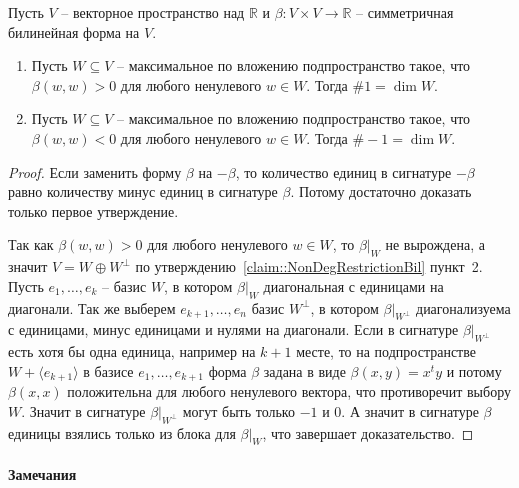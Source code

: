 \begin{claim}
Пусть $V$ -- векторное пространство над $\mathbb R$ и $\beta\colon V\times V\to \mathbb R$ -- симметричная билинейная форма на $V$.
\begin{enumerate}
\item Пусть $W\subseteq V$ -- максимальное по вложению подпространство такое, что $\beta(w, w) > 0$ для любого ненулевого $w\in W$.
Тогда $\#1 = \dim W$.

\item Пусть $W\subseteq V$ -- максимальное по вложению подпространство такое, что $\beta(w, w) < 0$ для любого ненулевого $w\in W$.
Тогда $\#-1 = \dim W$.
\end{enumerate}
\end{claim}
\begin{proof}
Если заменить форму $\beta$ на $-\beta$, то количество единиц в сигнатуре $-\beta$ равно количеству минус единиц в сигнатуре $\beta$.
Потому достаточно доказать только первое утверждение.


Так как $\beta(w, w) > 0$ для любого ненулевого $w\in W$, то $\beta|_W$ не вырождена, а значит $V = W\oplus W^\bot$  по утверждению~\ref{claim::NonDegRestrictionBil} пункт~2.
Пусть $e_1,\ldots,e_k$ -- базис $W$, в котором $\beta|_W$ диагональная с единицами на диагонали.
Так же выберем $e_{k+1},\ldots,e_n$ базис $W^\bot$, в котором $\beta|_{W^\bot}$ диагонализуема с единицами, минус единицами и нулями на диагонали.
Если в сигнатуре $\beta|_{W^\bot}$ есть хотя бы одна единица, например на $k+1$ месте, то на подпространстве $W+\langle e_{k+1}\rangle$ в базисе $e_1,\ldots,e_{k+1}$ форма $\beta$ задана в виде $\beta(x, y) = x^t y$ и потому $\beta(x,x)$ положительна для любого ненулевого вектора, что противоречит выбору $W$.
Значит в сигнатуре $\beta|_{W^\bot}$ могут быть только $-1$ и $0$.
А значит в сигнатуре $\beta$ единицы взялись только из блока для $\beta|_W$, что завершает доказательство.


\end{proof}

\paragraph{Замечания}

